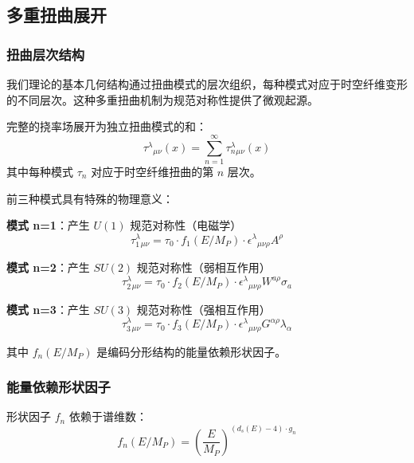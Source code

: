 \subsection{多重扭曲展开}
\label{sec:multiple_twisting}

\subsubsection{扭曲层次结构}

我们理论的基本几何结构通过扭曲模式的层次组织，每种模式对应于时空纤维变形的不同层次。这种多重扭曲机制为规范对称性提供了微观起源。

\begin{definition}[多重扭曲场]
完整的挠率场展开为独立扭曲模式的和：
\begin{equation}
    \tau^{\lambda}{}_{\mu\nu}(x) = \sum_{n=1}^{\infty} \tau_n^{\lambda}{}_{\mu\nu}(x)
\end{equation}
其中每种模式 $\tau_n$ 对应于时空纤维扭曲的第 $n$ 层次。
\end{definition}

前三种模式具有特殊的物理意义：

\textbf{模式 n=1}：产生 $U(1)$ 规范对称性（电磁学）
\begin{equation}
    \tau_1^{\lambda}{}_{\mu\nu} = \tau_0 \cdot f_1(E/M_P) \cdot \epsilon^{\lambda}{}_{\mu\nu\rho} A^{\rho}
\end{equation}

\textbf{模式 n=2}：产生 $SU(2)$ 规范对称性（弱相互作用）
\begin{equation}
    \tau_2^{\lambda}{}_{\mu\nu} = \tau_0 \cdot f_2(E/M_P) \cdot \epsilon^{\lambda}{}_{\mu\nu\rho} W^{a\rho} \sigma_a
\end{equation}

\textbf{模式 n=3}：产生 $SU(3)$ 规范对称性（强相互作用）
\begin{equation}
    \tau_3^{\lambda}{}_{\mu\nu} = \tau_0 \cdot f_3(E/M_P) \cdot \epsilon^{\lambda}{}_{\mu\nu\rho} G^{\alpha\rho} \lambda_{\alpha}
\end{equation}

其中 $f_n(E/M_P)$ 是编码分形结构的能量依赖形状因子。

\subsubsection{能量依赖形状因子}

形状因子 $f_n$ 依赖于谱维数：
\begin{equation}
    f_n(E/M_P) = \left(\frac{E}{M_P}\right)^{(d_s(E) - 4) \cdot g_n}
\end{equation}

